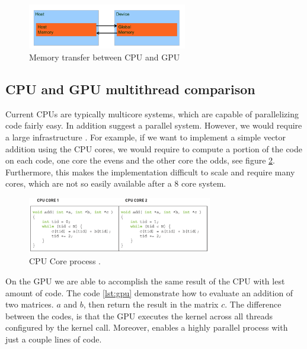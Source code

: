 \begin{figure}[htbp]
	\centering
		\includegraphics[width=0.62\textwidth]{Figures/memorySpace.png}
		\smallskip
	\caption[Memory transfer between CPU and GPU]{Memory transfer between CPU and GPU \cite{hwu}}
	\label{fig:memorySpace}
\end{figure}

\subsection{CPU and GPU multithread comparison}

Current CPUs are typically multicore systems, which are capable of parallelizing code fairly easy. In addition suggest a parallel system. However, we would require a large infrastructure  \cite{example}. For example, if we want to implement a simple vector addition using the CPU cores, we would require to compute a portion of the code on each code, one core the evens and the other core the odds, see figure \ref{fig:cpu}. Furthermore, this makes the implementation difficult to scale and require many cores, which are not so easily available after a 8 core system. 

\begin{figure}[htbp]
	\centering
		\includegraphics[width=0.72\textwidth]{Figures/cpu.png}
		\smallskip
	\caption[CPU Core process]{CPU Core process \cite{hwu}.}
	\label{fig:cpu}
\end{figure}


On the GPU we are able to accomplish the same result of the CPU with lest amount of code. The code \ref{lst:gpu} demonstrate how to evaluate an addition of two matrices. $a$ and $b$, then return the result in the matrix $c$. The difference between the codes, is that the GPU executes the kernel across all threads configured by the kernel call. Moreover, enables a highly parallel process with just a couple lines of code. 

